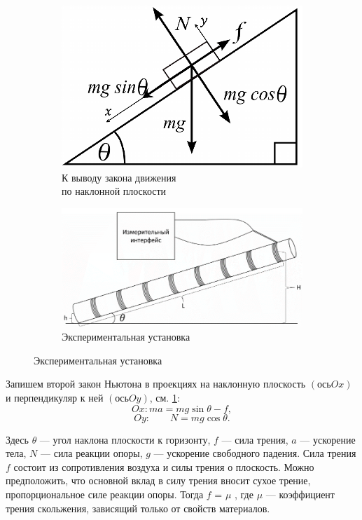 \documentclass[
	a4paper, %
	12pt, %
]{article}
\begin{document}
	\begin{figure}[h]
		\begin{subfigure}{0.5\textwidth}
			\includegraphics[width=0.9\linewidth]{scheme.png} 
			\caption{К выводу закона движения\\ по наклонной плоскости}
			\label{fig:subim1}
		\end{subfigure}
		\begin{subfigure}{0.5\textwidth}
			\includegraphics[width=0.9\linewidth]{tube.png}
			\caption{Экспериментальная установка}
			\label{fig:subim2}
		\end{subfigure}
	\end{figure}
	
	Запишем второй закон Ньютона в проекциях на наклонную плоскость $(ось Ox)$ и перпендикуляр к ней $(ось Oy)$, см. \ref{fig:subim1}:
	\begin{equation}
		Ox: ma = mg\sin{\theta} - f,
		\label{first}
	\end{equation}
	\begin{equation}
		Oy: \:\:\:\:\:\:\:\:\:N = mg\cos{\theta}.
		\label{second}
	\end{equation}
	
	Здесь $\theta$ — угол наклона плоскости к горизонту, $f$ — сила трения, $a$ — ускорение тела, $N$ — сила реакции опоры, $g$ — ускорение свободного падения.
	Сила трения $f$ состоит из сопротивления воздуха и силы трения о плоскость. Можно предположить, что основной вклад в
	силу трения вносит сухое трение, пропорциональное силе реакции опоры.
	Тогда $f$ = $\mu$ , где $\mu$ — коэффициент трения скольжения, зависящий только от свойств материалов.
		
\end{document}
